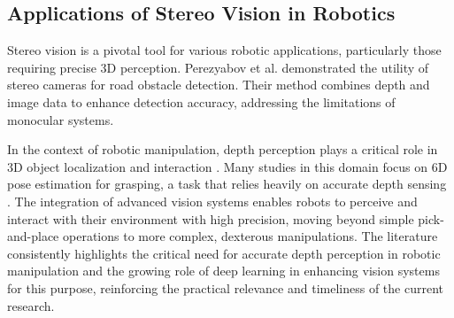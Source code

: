 \documentclass[conference]{IEEEtran}
\begin{document}
\subsection{Applications of Stereo Vision in Robotics}
Stereo vision is a pivotal tool for various robotic applications, particularly those requiring precise 3D perception. Perezyabov et al. \cite{perezyabov2022depth} demonstrated the utility of stereo cameras for road obstacle detection. Their method combines depth and image data to enhance detection accuracy, addressing the limitations of monocular systems.

In the context of robotic manipulation, depth perception plays a critical role in 3D object localization and interaction \cite{guo2025monocular, li2024virt, correll2024versatile, chen2024bio}. Many studies in this domain focus on 6D pose estimation for grasping, a task that relies heavily on accurate depth sensing \cite{du2021vision}. The integration of advanced vision systems enables robots to perceive and interact with their environment with high precision, moving beyond simple pick-and-place operations to more complex, dexterous manipulations. The literature consistently highlights the critical need for accurate depth perception in robotic manipulation and the growing role of deep learning in enhancing vision systems for this purpose, reinforcing the practical relevance and timeliness of the current research.


\end{document}
